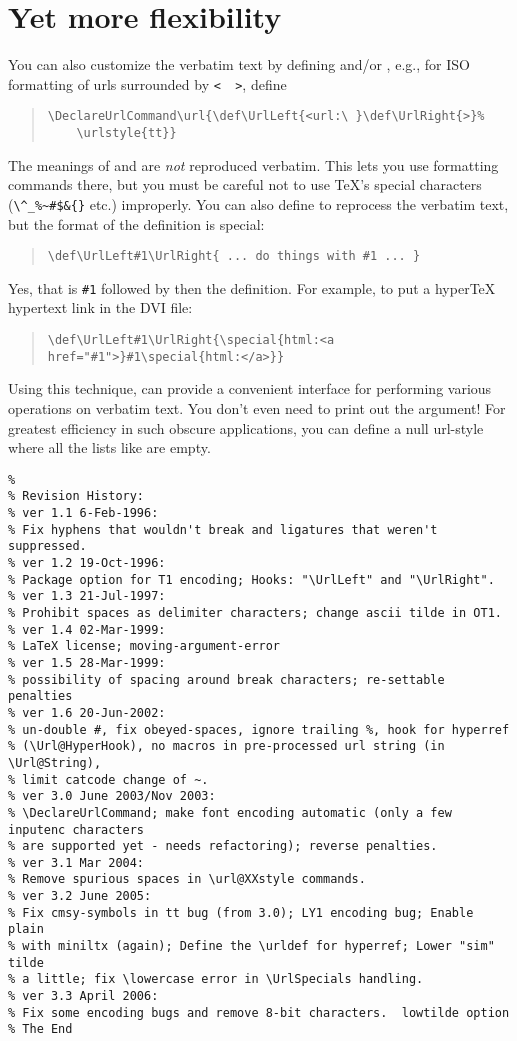 \documentclass[a4paper]{article}
\begin{document}
\section{Yet more flexibility}
You can also customize the verbatim text by defining 
and/or , e.g., for ISO formatting of urls surrounded by
\verb+<  >+, define
\begin{quote}
\begin{verbatim}
\DeclareUrlCommand\url{\def\UrlLeft{<url:\ }\def\UrlRight{>}%
    \urlstyle{tt}}
\end{verbatim}
\end{quote}
The meanings of  and  are \emph{not}
reproduced verbatim.  This lets you use formatting commands there, but
you must be careful not to use TeX's special characters
(\verb+\^_%~#$&{}+ etc.) improperly.  You can also define 
to reprocess the verbatim text, but the format of the definition is special:
\begin{quote}
\begin{verbatim}
\def\UrlLeft#1\UrlRight{ ... do things with #1 ... }
\end{verbatim}
\end{quote}
Yes, that is \verb+#1+ followed by  then the definition.  For
example, to put a hyperTeX hypertext link in the DVI file:
\begin{quote}
\begin{verbatim}
\def\UrlLeft#1\UrlRight{\special{html:<a href="#1">}#1\special{html:</a>}}
\end{verbatim}
\end{quote}
Using this technique,  can provide a convenient
interface for performing various operations on verbatim text.  You
don't even need to print out the argument!  For greatest efficiency in
such obscure applications, you can define a null url-style where all
the lists like  are empty.


\noindent\begin{verbatim}
%
% Revision History:
% ver 1.1 6-Feb-1996:
% Fix hyphens that wouldn't break and ligatures that weren't suppressed.
% ver 1.2 19-Oct-1996:
% Package option for T1 encoding; Hooks: "\UrlLeft" and "\UrlRight".
% ver 1.3 21-Jul-1997:
% Prohibit spaces as delimiter characters; change ascii tilde in OT1.
% ver 1.4 02-Mar-1999:
% LaTeX license; moving-argument-error
% ver 1.5 28-Mar-1999:
% possibility of spacing around break characters; re-settable penalties
% ver 1.6 20-Jun-2002:
% un-double #, fix obeyed-spaces, ignore trailing %, hook for hyperref
% (\Url@HyperHook), no macros in pre-processed url string (in \Url@String),
% limit catcode change of ~.
% ver 3.0 June 2003/Nov 2003:
% \DeclareUrlCommand; make font encoding automatic (only a few inputenc characters
% are supported yet - needs refactoring); reverse penalties. 
% ver 3.1 Mar 2004:
% Remove spurious spaces in \url@XXstyle commands.
% ver 3.2 June 2005:
% Fix cmsy-symbols in tt bug (from 3.0); LY1 encoding bug; Enable plain
% with miniltx (again); Define the \urldef for hyperref; Lower "sim" tilde
% a little; fix \lowercase error in \UrlSpecials handling.
% ver 3.3 April 2006:
% Fix some encoding bugs and remove 8-bit characters.  lowtilde option
% The End
\end{verbatim}
\end{document}
